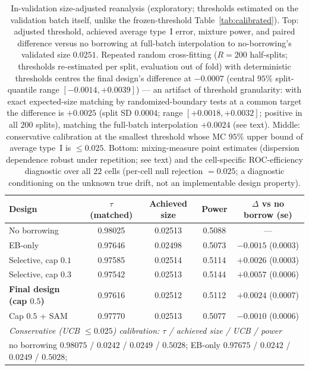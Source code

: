 \documentclass[11pt]{article}
\begin{document}
\begin{table}[htbp]
\centering
\small
\setlength{\tabcolsep}{4pt}
\caption{In-validation size-adjusted reanalysis (exploratory; thresholds
estimated on the validation batch itself, unlike the frozen-threshold
Table~\ref{tab:calibrated}). Top: adjusted threshold, achieved average
type~I error, mixture power, and paired difference versus no borrowing at
full-batch interpolation to no-borrowing's validated size $0.0251$.
Repeated random cross-fitting ($R = 200$ half-splits; thresholds
re-estimated per split, evaluation out of fold) with deterministic
thresholds centres the final
design's difference at $-0.0007$ (central $95\%$ split-quantile range
$[-0.0014, +0.0039]$) --- an artifact of threshold granularity: with
exact expected-size matching by randomized-boundary tests at a common
target the difference is $+0.0025$ (split SD $0.0004$; range
$[+0.0018, +0.0032]$; positive in all $200$ splits), matching the
full-batch interpolation $+0.0024$ (see text). Middle:
conservative
calibration at the smallest threshold whose MC $95\%$ upper bound of
average type~I is $\le 0.025$. Bottom: mixing-measure point estimates
(dispersion dependence robust under repetition; see text) and the cell-specific ROC-efficiency
diagnostic over all $22$ cells (per-cell null rejection $= 0.025$; a
diagnostic conditioning on the unknown true drift, not an implementable
design property).}
\label{tab:sizematched}
\begin{tabular}{lcccc}
\hline
Design & $\tau$ (matched) & Achieved size & Power & $\Delta$ vs no borrow
(se) \\
\hline
No borrowing & 0.98025 & 0.02513 & 0.5088 & --- \\
EB-only & 0.97646 & 0.02498 & 0.5073 & $-0.0015$ (0.0003) \\
Selective, cap $0.1$ & 0.97585 & 0.02514 & 0.5114 & $+0.0026$ (0.0003) \\
Selective, cap $0.3$ & 0.97542 & 0.02513 & 0.5144 & $+0.0057$ (0.0006) \\
\textbf{Final design (cap $0.5$)} & 0.97616 & 0.02512 & 0.5112 &
$+0.0024$ (0.0007) \\
Cap $0.5$ + SAM & 0.97770 & 0.02513 & 0.5077 & $-0.0010$ (0.0006) \\
\hline
\multicolumn{5}{l}{\emph{Conservative (UCB $\le 0.025$) calibration:
$\tau$ / achieved size / UCB / power}}\\
\multicolumn{5}{l}{no borrowing $0.98075$ / $0.0242$ / $0.0249$ /
$0.5028$; \quad EB-only $0.97675$ / $0.0242$ / $0.0249$ / $0.5028$;}\\

\end{tabular}
\end{table}
\end{document}
